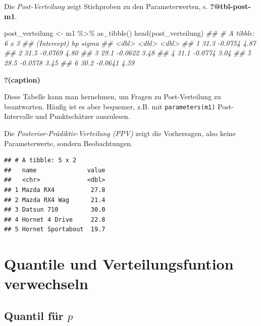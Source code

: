 \documentclass[
  a4paper,
  DIV=11]{scrreprt}
\newenvironment{Shaded}{\begin{snugshade}}{\end{snugshade}}
\newcommand{\DocumentationTok}[1]{\textcolor[rgb]{0.37,0.37,0.37}{\textit{#1}}}
\newcommand{\FunctionTok}[1]{\textcolor[rgb]{0.28,0.35,0.67}{#1}}
\newcommand{\NormalTok}[1]{\textcolor[rgb]{0.00,0.23,0.31}{#1}}
\newcommand{\OtherTok}[1]{\textcolor[rgb]{0.00,0.23,0.31}{#1}}
\newcommand{\SpecialCharTok}[1]{\textcolor[rgb]{0.37,0.37,0.37}{#1}}
\theoremstyle{definition}
\theoremstyle{remark}
\begin{document}
Die \emph{Post-Verteilung} zeigt Stichproben zu den Parameterwerten, s.
\textbf{?@tbl-post-m1}.

\begin{Shaded}
\begin{Highlighting}[]
\NormalTok{post\_verteilung }\OtherTok{\textless{}{-}}\NormalTok{ m1 }\SpecialCharTok{\%\textgreater{}\%} 
  \FunctionTok{as\_tibble}\NormalTok{()}
\FunctionTok{head}\NormalTok{(post\_verteilung)}
\DocumentationTok{\#\# \# A tibble: 6 x 3}
\DocumentationTok{\#\#   \textasciigrave{}(Intercept)\textasciigrave{}      hp sigma}
\DocumentationTok{\#\#           \textless{}dbl\textgreater{}   \textless{}dbl\textgreater{} \textless{}dbl\textgreater{}}
\DocumentationTok{\#\# 1          31.3 {-}0.0754  4.87}
\DocumentationTok{\#\# 2          31.5 {-}0.0769  4.80}
\DocumentationTok{\#\# 3          29.1 {-}0.0622  3.48}
\DocumentationTok{\#\# 4          31.1 {-}0.0774  3.04}
\DocumentationTok{\#\# 5          28.5 {-}0.0578  3.45}
\DocumentationTok{\#\# 6          30.2 {-}0.0641  4.59}
\end{Highlighting}
\end{Shaded}

\begin{table}

\caption{\textbf{?(caption)}}

\end{table}

Diese Tabelle kann man hernehmen, um Fragen zu Post-Verteilung zu
beantworten. Häufig ist es aber bequemer, z.B. mit
\texttt{parameters(m1)} Post-Intervalle und Punktschätzer auszulesen.

Die \emph{Posterior-Prädiktiv-Verteilung (PPV)} zeigt die Vorhersagen,
also keine Parameterwerte, sondern Beobachtungen.

\begin{verbatim}
## # A tibble: 5 x 2
##   name              value
##   <chr>             <dbl>
## 1 Mazda RX4          27.8
## 2 Mazda RX4 Wag      21.4
## 3 Datsun 710         30.0
## 4 Hornet 4 Drive     22.8
## 5 Hornet Sportabout  19.7
\end{verbatim}

\hypertarget{quantile-und-verteilungsfuntion-verwechseln}{%
\section{Quantile und Verteilungsfuntion verwechseln
🤷}\label{quantile-und-verteilungsfuntion-verwechseln}}

\hypertarget{quantil-fuxfcr-p}{%
\subsection{\texorpdfstring{Quantil für
\(p\)}{Quantil für p}}\label{quantil-fuxfcr-p}}
\end{document}
